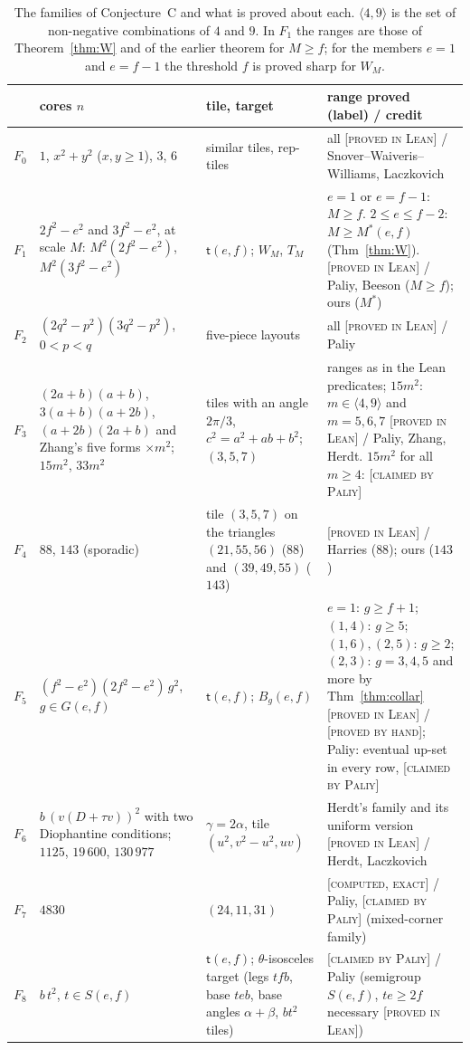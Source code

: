 \documentclass[11pt,reqno]{amsart}
\theoremstyle{plain}
\theoremstyle{definition}
\newcommand{\lab}[1]{\textup{[\textsc{#1}]}}
\newcommand{\PL}{\lab{proved in Lean}}
\newcommand{\PH}{\lab{proved by hand}}
\newcommand{\CE}{\lab{computed, exact}}
\newcommand{\CP}{\lab{claimed by Paliy}}
\newcommand{\tile}{\mathsf{t}}
\begin{document}
\begin{table}[ht]
\small
\renewcommand{\arraystretch}{1.15}
\begin{tabular}{@{}p{0.55cm}p{3.2cm}p{3.3cm}p{5.1cm}@{}}
\toprule
 & cores $n$ & tile, target & range proved \quad (label) / credit\\
\midrule
$F_0$ & $1$, $x^2+y^2$ ($x,y\ge1$), $3$, $6$ & similar tiles, rep-tiles & all \quad \PL{} / Snover--Waiveris--Williams, Laczkovich\\
$F_1$ & $2f^2-e^2$ and $3f^2-e^2$, at scale $M$: $M^2(2f^2-e^2)$, $M^2(3f^2-e^2)$ & $\tile(e,f)$; $W_M$, $T_M$ & $e=1$ or $e=f-1$: $M\ge f$. $2\le e\le f-2$: $M\ge M^*(e,f)$ (Thm~\ref{thm:W}). \quad \PL{} / Paliy, Beeson ($M\ge f$); ours ($M^*$)\\
$F_2$ & $(2q^2-p^2)(3q^2-p^2)$, $0<p<q$ & five-piece layouts & all \quad \PL{} / Paliy\\
$F_3$ & $(2a+b)(a+b)$, $3(a+b)(a+2b)$, $(a+2b)(2a+b)$ and Zhang's five forms $\times m^2$; $15m^2$, $33m^2$ & tiles with an angle $2\pi/3$, $c^2=a^2+ab+b^2$; $(3,5,7)$ & ranges as in the Lean predicates; $15m^2$: $m\in\langle4,9\rangle$ and $m=5,6,7$ \quad \PL{} / Paliy, Zhang, Herdt. $15m^2$ for all $m\ge4$: \CP{}\\
$F_4$ & $88$, $143$ (sporadic) & tile $(3,5,7)$ on the triangles $(21,55,56)$ ($88$) and $(39,49,55)$ ($143$) & \PL{} / Harries ($88$); ours ($143$)\\
$F_5$ & $(f^2-e^2)(2f^2-e^2)\,g^2$, $g\in G(e,f)$ & $\tile(e,f)$; $B_g(e,f)$ & $e=1$: $g\ge f+1$; $(1,4)$: $g\ge5$; $(1,6),(2,5)$: $g\ge2$; $(2,3)$: $g=3,4,5$ and more by Thm~\ref{thm:collar} \quad \PL{} / \PH{}; Paliy: eventual up-set in every row, \CP{}\\
$F_6$ & $b\,(v(D+\tau v))^2$ with two Diophantine conditions; $1125$, $19\,600$, $130\,977$ & $\gamma=2\alpha$, tile $(u^2,v^2-u^2,uv)$ & Herdt's family and its uniform version \quad \PL{} / Herdt, Laczkovich\\
$F_7$ & $4830$ & $(24,11,31)$ & \CE{} / Paliy, \CP{} (mixed-corner family)\\
$F_8$ & $b\,t^2$, $t\in S(e,f)$ & $\tile(e,f)$; $\theta$-isosceles target (legs $tfb$, base $teb$, base angles $\alpha+\beta$, $bt^2$ tiles) & \CP{} / Paliy (semigroup $S(e,f)$, $te\ge2f$ necessary \PL{})\\
\bottomrule
\end{tabular}
\caption{The families of Conjecture~C and what is proved about each. $\langle4,9\rangle$ is the set of non-negative combinations of $4$ and $9$. In $F_1$ the ranges are those of Theorem~\ref{thm:W} and of the earlier theorem for $M\ge f$; for the members $e=1$ and $e=f-1$ the threshold $f$ is proved sharp for $W_M$.}\label{tab:families}
\end{table}
\end{document}
